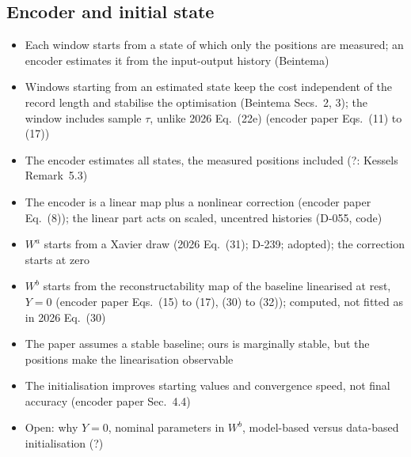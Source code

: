 \subsection{Encoder and initial state}\label{sec:aug_encoder}
\ifdraft
\begin{itemize}
\item Each window starts from a state of which only the positions are measured; an encoder estimates it from the input-output history (Beintema)
\item Windows starting from an estimated state keep the cost independent of the record length and stabilise the optimisation (Beintema Secs.~2, 3); the window includes sample $\tau$, unlike 2026 Eq.~(22e) (encoder paper Eqs.~(11) to (17))
\item The encoder estimates all states, the measured positions included (?: Kessels Remark~5.3)
\item The encoder is a linear map plus a nonlinear correction (encoder paper Eq.~(8)); the linear part acts on scaled, uncentred histories (D-055, code)
\item $W^a$ starts from a Xavier draw (2026 Eq.~(31); D-239; adopted); the correction starts at zero
\item $W^b$ starts from the reconstructability map of the baseline linearised at rest, $Y=0$ (encoder paper Eqs.~(15) to (17), (30) to (32)); computed, not fitted as in 2026 Eq.~(30)
\item The paper assumes a stable baseline; ours is marginally stable, but the positions make the linearisation observable
\item The initialisation improves starting values and convergence speed, not final accuracy (encoder paper Sec.~4.4)
\item Open: why $Y=0$, nominal parameters in $W^b$, model-based versus data-based initialisation (?)
\end{itemize}
\fi

